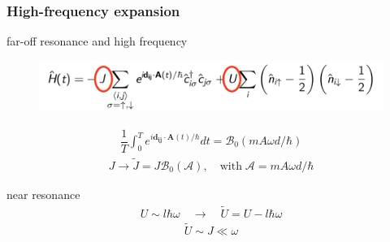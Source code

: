 \documentclass[]{beamer}
\begin{document}
\begin{frame}
\frametitle{High-frequency expansion}
\pause
\begin{block}{far-off resonance and high frequency}
\begin{minipage}{.3\columnwidth}
\pause
\end{minipage}
\begin{minipage}{.65\columnwidth}
\begin{figure}[!htb]
\centering
\includegraphics[width=1.08\columnwidth]{figs/Ht.png}
\end{figure}
\begin{align*}
    \dfrac{1}{T}\int_0^T e^{i\mathbf{d_{ij}}\cdot \mathbf{A}(t)/\hbar} dt 
    = \mathcal{B}_0(mA\omega d/\hbar)
\end{align*}
\begin{align*}
    J \rightarrow \tilde{J} = J\mathcal{B}_0(\mathcal{A}), 
    \quad \text{with} \; \mathcal{A} = mA\omega d/\hbar
\end{align*}
\end{minipage}
\pause
\end{block}
\begin{block}{near resonance}
\vspace{-3ex}
\begin{align*}
    U \sim l\hbar\omega \quad \rightarrow \quad \tilde{U} = U - l\hbar\omega
\end{align*}
\vspace{-5ex}
\begin{align*}
    \tilde{U} \sim J \ll \omega
\end{align*}
\end{block}
\end{frame}
\end{document}
